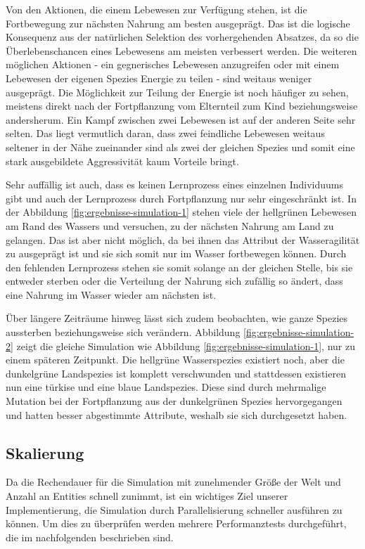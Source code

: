 \documentclass[course=erap]{aspdoc}
\begin{document}
Von den Aktionen, die einem Lebewesen zur Verfügung stehen, ist die Fortbewegung zur nächsten Nahrung am besten ausgeprägt. Das ist die logische Konsequenz aus der natürlichen Selektion des vorhergehenden Absatzes, da so die Überlebenschancen eines Lebewesens am meisten verbessert werden. Die weiteren möglichen Aktionen - ein gegnerisches Lebewesen anzugreifen oder mit einem Lebewesen der eigenen Spezies Energie zu teilen - sind weitaus weniger ausgeprägt. Die Möglichkeit zur Teilung der Energie ist noch häufiger zu sehen, meistens direkt nach der Fortpflanzung vom Elternteil zum Kind beziehungsweise andersherum. Ein Kampf zwischen zwei Lebewesen ist auf der anderen Seite sehr selten. Das liegt vermutlich daran, dass zwei feindliche Lebewesen weitaus seltener in der Nähe zueinander sind als zwei der gleichen Spezies und somit eine stark ausgebildete Aggressivität kaum Vorteile bringt.

Sehr auffällig ist auch, dass es keinen Lernprozess eines einzelnen Individuums gibt und auch der Lernprozess durch Fortpflanzung nur sehr eingeschränkt ist. In der Abbildung \ref{fig:ergebnisse-simulation-1} stehen viele der hellgrünen Lebewesen am Rand des Wassers und versuchen, zu der nächsten Nahrung am Land zu gelangen. Das ist aber nicht möglich, da bei ihnen das Attribut der Wasseragilität zu ausgeprägt ist und sie sich somit nur im Wasser fortbewegen können. Durch den fehlenden Lernprozess stehen sie somit solange an der gleichen Stelle, bis sie entweder sterben oder die Verteilung der Nahrung sich zufällig so ändert, dass eine Nahrung im Wasser wieder am nächsten ist.

Über längere Zeiträume hinweg lässt sich zudem beobachten, wie ganze Spezies aussterben beziehungsweise sich verändern. Abbildung \ref{fig:ergebnisse-simulation-2} zeigt die gleiche Simulation wie Abbildung \ref{fig:ergebnisse-simulation-1}, nur zu einem späteren Zeitpunkt. Die hellgrüne Wasserspezies existiert noch, aber die dunkelgrüne Landspezies ist komplett verschwunden und stattdessen existieren nun eine türkise und eine blaue Landspezies. Diese sind durch mehrmalige Mutation bei der Fortpflanzung aus der dunkelgrünen Spezies hervorgegangen und hatten besser abgestimmte Attribute, weshalb sie sich durchgesetzt haben.

\subsection{Skalierung}
Da die Rechendauer für die Simulation mit zunehmender Größe der Welt und Anzahl an Entities schnell zunimmt, ist ein wichtiges Ziel unserer Implementierung, die Simulation durch Parallelisierung schneller ausführen zu können. Um dies zu überprüfen werden mehrere Performanztests durchgeführt, die im nachfolgenden beschrieben sind.
\end{document}
